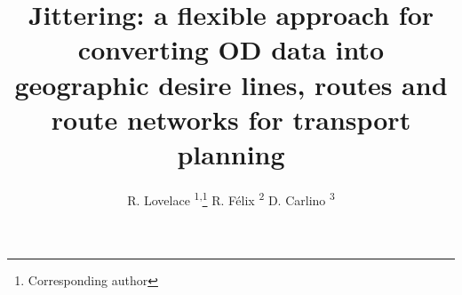 \documentclass{isprs} %
\begin{document}
\title{Jittering: a flexible approach for converting OD data into geographic desire lines, routes and route networks for transport planning}
\date{}


\author{
R. Lovelace \textsuperscript{1,}\thanks{Corresponding author}
R. Félix \textsuperscript{2}
D. Carlino \textsuperscript{3}
}

\address{
\textsuperscript{1} Institute for Transport Studies, University of Leeds, UK - r.lovelace@leeds.ac.uk \\
\textsuperscript{2} CERIS, Instituto Superior Técnico, University of Lisbon, Portugal - rosamfelix@tecnico.ulisboa.pt \\
\textsuperscript{3} Alan Turing Institute, UK - dcarlino@turing.ac.uk
}



\icwg{}   %
\end{document}
